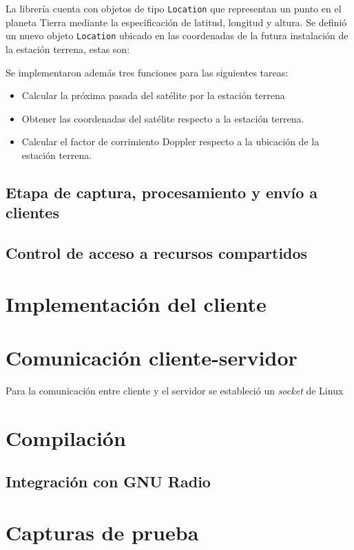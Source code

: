 \documentclass[../../main.tex]{subfiles}
\begin{document}
La librería cuenta con objetos de tipo \texttt{Location} que representan un punto en el planeta Tierra mediante la especificación de latitud, longitud y altura. Se definió un nuevo objeto \texttt{Location} ubicado en las coordenadas de la futura instalación de la estación terrena, estas son:

Se implementaron además tres funciones para las siguientes tareas:
\begin{itemize}
    \item Calcular la próxima pasada del satélite por la estación terrena
    \item Obtener las coordenadas del satélite respecto a la estación terrena.
    \item Calcular el factor de corrimiento Doppler respecto a la ubicación de la estación terrena.
\end{itemize}

\subsection{Etapa de captura, procesamiento y envío a clientes}



\subsection{Control de acceso a recursos compartidos}

\section{Implementación del cliente}

\section{Comunicación cliente-servidor}
Para la comunicación entre cliente y el servidor se estableció un \textit{socket} de Linux

\section{Compilación}
\subsection{Integración con GNU Radio}
\section{Capturas de prueba}
\end{document}
